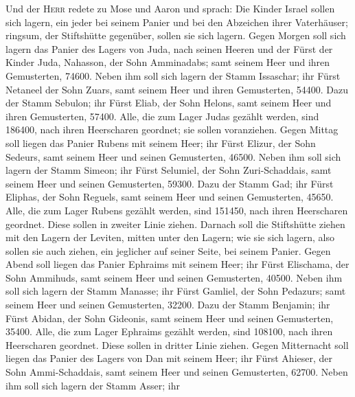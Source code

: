  Und der \textsc{Herr} redete zu Mose und Aaron und
sprach: Die Kinder Israel sollen sich lagern,  ein jeder
bei seinem Panier und bei den Abzeichen ihrer Vaterhäuser; ringsum, der
Stiftshütte gegenüber, sollen sie sich lagern.  Gegen
Morgen soll sich lagern das Panier des Lagers von Juda, nach seinen
Heeren und der Fürst der Kinder Juda, Nahasson, der Sohn Amminadabs;
 samt seinem Heer und ihren Gemusterten, 74600.
 Neben ihm soll sich lagern der Stamm Issaschar; ihr Fürst
Netaneel der Sohn Zuars,  samt seinem Heer und ihren
Gemusterten, 54400.  Dazu der Stamm Sebulon; ihr Fürst
Eliab, der Sohn Helons,  samt seinem Heer und ihren
Gemusterten, 57400.  Alle, die zum Lager Judas gezählt
werden, sind 186400, nach ihren Heerscharen geordnet; sie sollen
voranziehen.  Gegen Mittag soll liegen das Panier Rubens
mit seinem Heer; ihr Fürst Elizur, der Sohn Sedeurs, 
samt seinem Heer und seinen Gemusterten, 46500.  Neben
ihm soll sich lagern der Stamm Simeon; ihr Fürst Selumiel, der Sohn
Zuri-Schaddais,  samt seinem Heer und seinen Gemusterten,
59300.  Dazu der Stamm Gad; ihr Fürst Eliphas, der Sohn
Reguels,  samt seinem Heer und seinen Gemusterten, 45650.
 Alle, die zum Lager Rubens gezählt werden, sind 151450,
nach ihren Heerscharen geordnet. Diese sollen in zweiter Linie ziehen.
 Darnach soll die Stiftshütte ziehen mit den Lagern der
Leviten, mitten unter den Lagern; wie sie sich lagern, also sollen sie
auch ziehen, ein jeglicher auf seiner Seite, bei seinem Panier.
 Gegen Abend soll liegen das Panier Ephraims mit seinem
Heer; ihr Fürst Elischama, der Sohn Ammihuds,  samt
seinem Heer und seinen Gemusterten, 40500.  Neben ihm
soll sich lagern der Stamm Manasse; ihr Fürst Gamliel, der Sohn
Pedazurs;  samt seinem Heer und seinen Gemusterten,
32200.  Dazu der Stamm Benjamin; ihr Fürst Abidan, der
Sohn Gideonis,  samt seinem Heer und seinen Gemusterten,
35400.  Alle, die zum Lager Ephraims gezählt werden, sind
108100, nach ihren Heerscharen geordnet. Diese sollen in dritter Linie
ziehen.  Gegen Mitternacht soll liegen das Panier des
Lagers von Dan mit seinem Heer; ihr Fürst Ahieser, der Sohn
Ammi-Schaddais,  samt seinem Heer und seinen Gemusterten,
62700.  Neben ihm soll sich lagern der Stamm Asser; ihr
